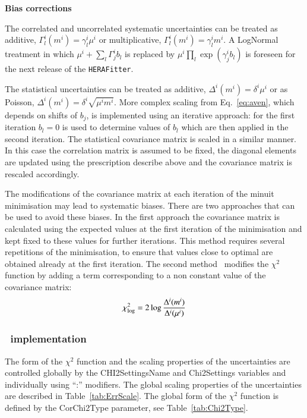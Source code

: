 \begin{description}
\item \bf{Bias corrections}\rm

The correlated and uncorrelated systematic uncertainties can be treated as additive,  $\Gamma^i_l(m^i) = \gamma^i_l \mu^i$
or multiplicative, $\Gamma^i_l(m^i) = \gamma^i_l m^i$. A LogNormal treatment in which 
$ \mu^i + \sum_l \Gamma^i_j b_l$ is replaced by $ \mu^i \prod_l \exp( \gamma^i_j b_l) $ is foreseen for the
next release of the {\tt HERAFitter}. 

The statistical uncertainties can be treated as additive, $\Delta^i(m^i) = \delta^i \mu^i$  or as Poisson,
$\Delta^i(m^i) = \delta^i \sqrt{\mu^i m^i}$. More complex scaling from Eq.~\ref{eq:aven}, 
which depends on shifts of $b_j$, is implemented using an iterative approach: for the first iteration $b_l =0$ 
 is used to determine values of $b_l$ which are then applied in the second iteration. The statistical covariance
matrix is scaled in a similar manner. In this case the correlation matrix is assumed to be fixed, the diagonal
elements are updated using the prescription describe above and the covariance matrix is rescaled accordingly.

The modifications of the covariance matrix at each iteration of the minuit minimisation may lead to systematic
biases. There are two approaches that can be used to avoid these biases. In the first approach the covariance matrix is calculated
using the expected values at the first iteration of the minimisation and kept fixed to these values for further
iterations. This method requires several repetitions of the minimisation, to ensure that values close to optimal
are obtained already at the first iteration. The second method~\cite{h1:2012kk} modifies the $\chi^2$ function by adding a term
corresponding to a non constant value of the covariance matrix:
\begin{equation}
 \chi^2_{\rm log} = 2 \log \frac{\Delta^i(m^i)}{\Delta^i(\mu^i)} 
\end{equation}  
\end{description}


\subsubsection{\fitter\ implementation}
The form of the $\chi^2$ function and the scaling properties of the 
uncertainties are controlled globally by the {\sc CHI2SettingsName} and
{\sc  Chi2Settings} variables and individually using {\sc ``:''} modifiers.
The global scaling properties of the uncertainties are described in 
Table~\ref{tab:ErrScale}. The global form of the $\chi^2$ function
is defined by the {\sc CorChi2Type} parameter, see   
Table~\ref{tab:Chi2Type}.

